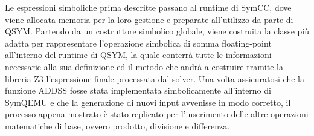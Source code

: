 \documentclass[Lau, oneside]{sapthesis}%
\begin{document}
\newline
Le espressioni simboliche prima descritte passano al runtime di SymCC, dove viene allocata memoria per la loro gestione e preparate all'utilizzo da parte di QSYM.
\newline
Partendo da un costruttore simbolico globale, viene costruita la classe più adatta per rappresentare l'operazione simbolica di somma floating-point all'interno del runtime di QSYM, la quale conterrà tutte le informazioni necessarie alla sua definizione ed il metodo che andrà a costruire tramite la libreria Z3 l'espressione finale processata dal solver.
\newline \newline
Una volta assicuratosi che la funzione ADDSS fosse stata implementata simbolicamente all'interno di SymQEMU e che la generazione di nuovi input avvenisse in modo corretto, il processo appena mostrato è stato replicato per l'inserimento delle altre operazioni matematiche di base, ovvero prodotto, divisione e differenza.




\newpage
\end{document}
